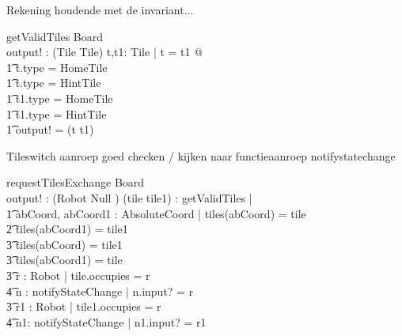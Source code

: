 \documentclass[a4paper,11pt]{article}
\begin{document}
Rekening houdende met de invariant...
\begin{schema}{getValidTiles}
\Xi Board \\
output! : (Tile \cross Tile)
\where
\exists t,t1: Tile | t \not = t1  @ \\ \t1
t.type \not = HomeTile \\ \t1
t.type \not = HintTile \\ \t1
t1.type \not = HomeTile \\ \t1
t1.type \not = HintTile \implies \\ \t1
output! = (t \cross t1)
\end{schema}

Tileswitch aanroep goed checken / kijken naar functieaanroep notifystatechange
\begin{schema}{requestTilesExchange}
\Delta Board \\
output! : ({Robot \union Null} )
\where
\exists (tile \cross tile1) : getValidTiles | \\ \t1
\exists abCoord, abCoord1 : AbsoluteCoord | tiles(abCoord) = tile \\ \t2
tiles(abCoord1) = tile1 \implies \\ \t3
tiles(abCoord) = tile1 \\ \t3
tiles(abCoord1) = tile \\ \t3
\exists r : Robot | tile.occupies = r \implies \\ \t4
\exists n : notifyStateChange | n.input? = r \\ \t3
\exists r1 : Robot | tile1.occupies = r \implies \\ \t4
\exists n1: notifyStateChange | n1.input? = r1
\end{schema}
\end{document}
